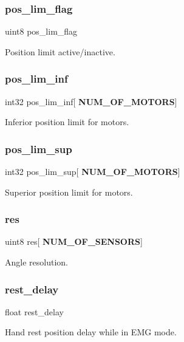 \subsubsection{pos\+\_\+lim\+\_\+flag}
{\footnotesize\ttfamily uint8 pos\+\_\+lim\+\_\+flag}

Position limit active/inactive. \mbox{\label{structst__mem_a631265c712a620e03d9233634e1819a2}} 
\subsubsection{pos\+\_\+lim\+\_\+inf}
{\footnotesize\ttfamily int32 pos\+\_\+lim\+\_\+inf[\textbf{ N\+U\+M\+\_\+\+O\+F\+\_\+\+M\+O\+T\+O\+RS}]}

Inferior position limit for motors. \mbox{\label{structst__mem_a818808d7c324999701b5aad40a8fabca}} 
\subsubsection{pos\+\_\+lim\+\_\+sup}
{\footnotesize\ttfamily int32 pos\+\_\+lim\+\_\+sup[\textbf{ N\+U\+M\+\_\+\+O\+F\+\_\+\+M\+O\+T\+O\+RS}]}

Superior position limit for motors. \mbox{\label{structst__mem_ac2e19d167eac4c8ca9ce97c646e78595}} 
\subsubsection{res}
{\footnotesize\ttfamily uint8 res[\textbf{ N\+U\+M\+\_\+\+O\+F\+\_\+\+S\+E\+N\+S\+O\+RS}]}

Angle resolution. \mbox{\label{structst__mem_a5d9f92583ac10c78cbb3c0da7a373f6a}} 
\subsubsection{rest\+\_\+delay}
{\footnotesize\ttfamily float rest\+\_\+delay}

Hand rest position delay while in E\+MG mode. \mbox{\label{structst__mem_a27742da1d6ad36d8051848f9e4346146}} 
